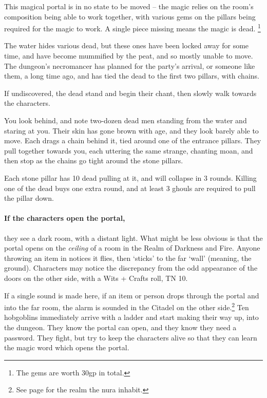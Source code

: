 \begin{multicols}{2}
\begin{boxtext}
\end{boxtext}

This magical portal is in no state to be moved -- the magic relies on the room's composition being able to work together, with various gems on the pillars being required for the magic to work.
A single piece missing means the magic is dead.%
\footnote{The gems are worth 30gp in total.}

The water hides various dead, but these ones have been locked away for some time, and have become mummified by the peat, and so mostly unable to move.  The dungeon's necromancer has planned for the party's arrival, or someone like them, a long time ago, and has tied the dead to the first two pillars, with chains.

If undiscovered, the dead stand and begin their chant, then slowly walk towards the characters.

\begin{boxtext}

  You look behind, and note two-dozen dead men standing from the water and staring at you.
  Their skin has gone brown with age, and they look barely able to move.
  Each drags a chain behind it, tied around one of the entrance pillars.
  They pull together towards you, each uttering the same strange, chanting moan, and then stop as the chains go tight around the stone pillars.

\end{boxtext}

Each stone pillar has 10 dead pulling at it, and will collapse in 3 rounds.  Killing one of the dead buys one extra round, and at least 3 ghouls are required to pull the pillar down.

\paragraph{If the characters open the portal,}
they see a dark room, with a distant light.
What might be less obvious is that the portal opens on the \emph{ceiling} of a room in the Realm of Darkness and Fire.
Anyone throwing an item in notices it flies, then `sticks' to the far `wall' (meaning, the ground).
Characters may notice the discrepancy from the odd appearance of the doors on the other side, with a Wits + Crafts roll, TN 10.

If a single sound is made here, if an item or person drops through the portal and into the far room, the alarm is sounded in the Citadel on the other side.\footnote{See page \pageref{darknessandfire} for the realm the nura inhabit.}
Ten hobgoblins immediately arrive with a ladder and start making their way up, into the dungeon.
They know the portal can open, and they know they need a password.
They fight, but try to keep the characters alive so that they can learn the magic word which opens the portal.


\end{multicols}
